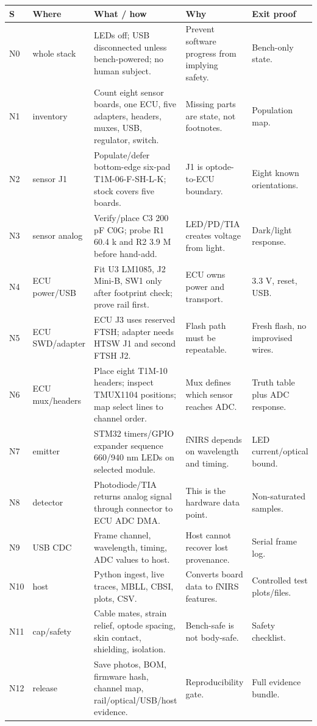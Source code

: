 \documentclass[10pt]{article}
\begin{document}
\begin{center}\scriptsize
\begin{tabular}{|L{0.36in}|L{0.95in}|L{1.75in}|L{1.55in}|L{1.35in}|}
\hline
\textbf{S} & \textbf{Where} & \textbf{What / how} & \textbf{Why} & \textbf{Exit proof} \\
\hline
N0 & whole stack & LEDs off; USB disconnected unless bench-powered; no human subject. & Prevent software progress from implying safety. & Bench-only state. \\
\hline
N1 & inventory & Count eight sensor boards, one ECU, five adapters, headers, muxes, USB, regulator, switch. & Missing parts are state, not footnotes. & Population map. \\
\hline
N2 & sensor J1 & Populate/defer bottom-edge six-pad T1M-06-F-SH-L-K; stock covers five boards. & J1 is optode-to-ECU boundary. & Eight known orientations. \\
\hline
N3 & sensor analog & Verify/place C3 200 pF C0G; probe R1 60.4 k and R2 3.9 M before hand-add. & LED/PD/TIA creates voltage from light. & Dark/light response. \\
\hline
N4 & ECU power/USB & Fit U3 LM1085, J2 Mini-B, SW1 only after footprint check; prove rail first. & ECU owns power and transport. & 3.3 V, reset, USB. \\
\hline
N5 & ECU SWD/adapter & ECU J3 uses reserved FTSH; adapter needs HTSW J1 and second FTSH J2. & Flash path must be repeatable. & Fresh flash, no improvised wires. \\
\hline
N6 & ECU mux/headers & Place eight T1M-10 headers; inspect TMUX1104 positions; map select lines to channel order. & Mux defines which sensor reaches ADC. & Truth table plus ADC response. \\
\hline
N7 & emitter & STM32 timers/GPIO expander sequence 660/940 nm LEDs on selected module. & fNIRS depends on wavelength and timing. & LED current/optical bound. \\
\hline
N8 & detector & Photodiode/TIA returns analog signal through connector to ECU ADC DMA. & This is the hardware data point. & Non-saturated samples. \\
\hline
N9 & USB CDC & Frame channel, wavelength, timing, ADC values to host. & Host cannot recover lost provenance. & Serial frame log. \\
\hline
N10 & host & Python ingest, live traces, MBLL, CBSI, plots, CSV. & Converts board data to fNIRS features. & Controlled test plots/files. \\
\hline
N11 & cap/safety & Cable mates, strain relief, optode spacing, skin contact, shielding, isolation. & Bench-safe is not body-safe. & Safety checklist. \\
\hline
N12 & release & Save photos, BOM, firmware hash, channel map, rail/optical/USB/host evidence. & Reproducibility gate. & Full evidence bundle. \\
\hline
\end{tabular}
\end{center}
\end{document}
